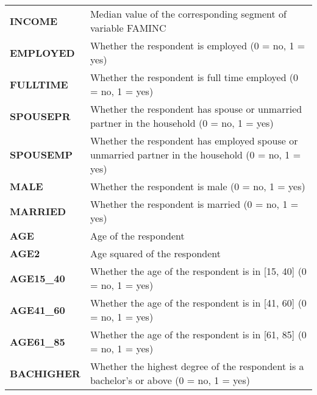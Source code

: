 \documentclass[12pt,a4paper]{article}
\begin{document}
\begin{longtable}{|p{}|p{}|}
\textbf{INCOME} &

Median value of the corresponding segment of variable FAMINC \\

\textbf{EMPLOYED} &

Whether the respondent is employed (0 = no, 1 = yes) \\

\textbf{FULLTIME} &

Whether the respondent is full time employed (0 = no, 1 = yes) \\

\textbf{SPOUSEPR} &

Whether the respondent has spouse or unmarried partner in the household (0 = no, 1 = yes) \\

\textbf{SPOUSEMP} &

Whether the respondent has employed spouse or unmarried partner in the household (0 = no, 1 = yes) \\

\textbf{MALE} &

Whether the respondent is male (0 = no, 1 = yes) \\

\textbf{MARRIED} &

Whether the respondent is married (0 = no, 1 = yes) \\

\textbf{AGE} &

Age of the respondent \\

\textbf{AGE2} &

Age squared of the respondent \\

\textbf{AGE15\_40} &

Whether the age of the respondent is in [15, 40] (0 = no, 1 = yes) \\

\textbf{AGE41\_60} &

Whether the age of the respondent is in [41, 60] (0 = no, 1 = yes) \\

\textbf{AGE61\_85} &

Whether the age of the respondent is in [61, 85] (0 = no, 1 = yes) \\

\textbf{BACHIGHER} &

Whether the highest degree of the respondent is a bachelor's or above (0 = no, 1 = yes) \\


\end{longtable}
\end{document}
